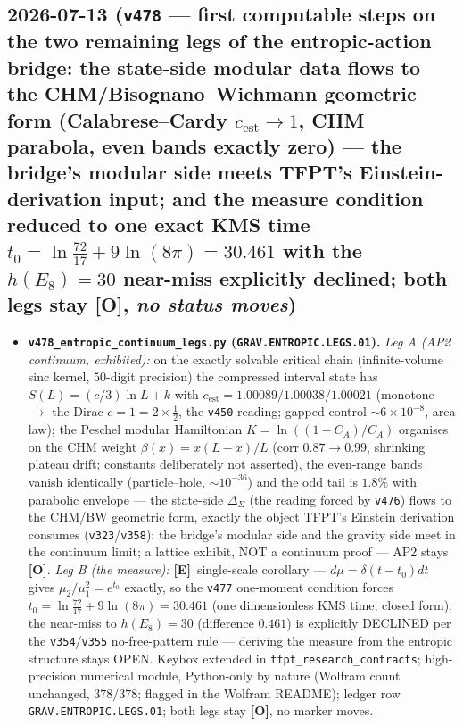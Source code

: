 \documentclass[11pt]{article}
\providecommand{\mE}{\textbf{[E]}}\providecommand{\mC}{\textbf{[C]}}
\providecommand{\mO}{\textbf{[O]}}\providecommand{\mX}{\textbf{[X]}}
\begin{document}
\subsection*{2026-07-13 (\texttt{v478} --- first computable steps on the two remaining legs of the entropic-action bridge: the state-side modular data flows to the CHM/Bisognano--Wichmann geometric form (Calabrese--Cardy $c_{\mathrm{est}}{\to}1$, CHM parabola, even bands exactly zero) --- the bridge's modular side meets TFPT's Einstein-derivation input; and the measure condition reduced to one exact KMS time $t_0=\ln\tfrac{72}{17}+9\ln(8\pi)=30.461$ with the $h(E_8){=}30$ near-miss explicitly declined; both legs stay \mO, \emph{no status moves})}
\begin{itemize}[leftmargin=1.5em]
\item \textbf{\texttt{v478\_entropic\_continuum\_legs.py} (\texttt{GRAV.ENTROPIC.LEGS.01}).}
\emph{Leg A (AP2 continuum, exhibited):} on the exactly solvable critical chain (infinite-volume sinc
kernel, $50$-digit precision) the compressed interval state has $S(L){=}(c/3)\ln L{+}k$ with
$c_{\mathrm{est}}{=}1.00089/1.00038/1.00021$ (monotone $\to$ the Dirac $c{=}1{=}2{\times}\tfrac12$, the
\texttt{v450} reading; gapped control $\sim6{\times}10^{-8}$, area law); the Peschel modular Hamiltonian
$K{=}\ln((1{-}C_A)/C_A)$ organises on the CHM weight $\beta(x){=}x(L{-}x)/L$ (corr $0.87{\to}0.99$,
shrinking plateau drift; constants deliberately not asserted), the even-range bands vanish identically
(particle--hole, $\sim10^{-36}$) and the odd tail is $1.8\%$ with parabolic envelope --- the state-side
$\Delta_\Sigma$ (the reading forced by \texttt{v476}) flows to the CHM/BW geometric form, exactly the
object TFPT's Einstein derivation consumes (\texttt{v323}/\texttt{v358}): the bridge's modular side and
the gravity side meet in the continuum limit; a lattice exhibit, NOT a continuum proof --- AP2 stays
\mO. \emph{Leg B (the measure):} \mE\ single-scale corollary --- $d\mu{=}\delta(t{-}t_0)dt$ gives
$\mu_2/\mu_1^2{=}e^{t_0}$ exactly, so the \texttt{v477} one-moment condition forces
$t_0{=}\ln\tfrac{72}{17}{+}9\ln(8\pi){=}30.461$ (one dimensionless KMS time, closed form); the
near-miss to $h(E_8){=}30$ (difference $0.461$) is explicitly DECLINED per the
\texttt{v354}/\texttt{v355} no-free-pattern rule --- deriving the measure from the entropic structure
stays OPEN. Keybox extended in \texttt{tfpt\_research\_contracts}; high-precision numerical module,
Python-only by nature (Wolfram count unchanged, $378/378$; flagged in the Wolfram README); ledger row
\texttt{GRAV.ENTROPIC.LEGS.01}; both legs stay \mO, no marker moves.
\end{itemize}
\end{document}
